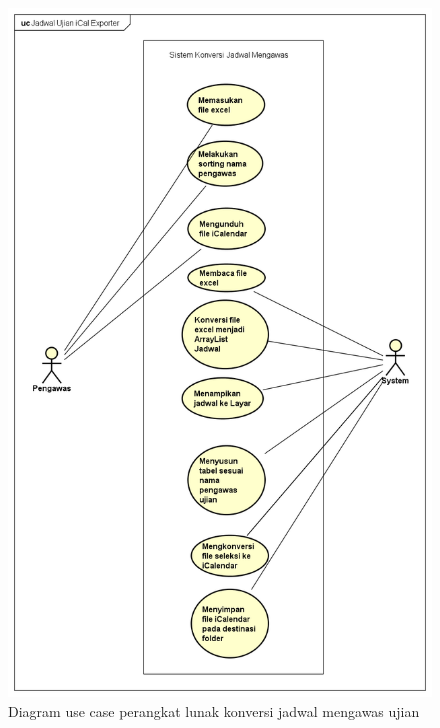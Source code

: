 \begin{figure}[h]
	\centering
	\includegraphics[scale=0.5]{Gambar/useCaseJadwal}
	\caption{Diagram use case perangkat lunak konversi jadwal mengawas ujian}
	\label{fig:useCaseJadwal}
	\end{figure}

